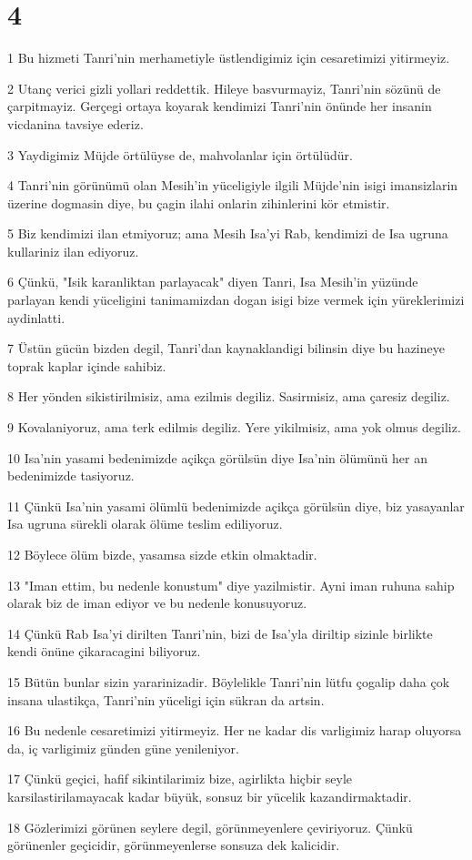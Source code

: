 \chapter{4}

\par 1 Bu hizmeti Tanri'nin merhametiyle üstlendigimiz için cesaretimizi yitirmeyiz.
\par 2 Utanç verici gizli yollari reddettik. Hileye basvurmayiz, Tanri'nin sözünü de çarpitmayiz. Gerçegi ortaya koyarak kendimizi Tanri'nin önünde her insanin vicdanina tavsiye ederiz.
\par 3 Yaydigimiz Müjde örtülüyse de, mahvolanlar için örtülüdür.
\par 4 Tanri'nin görünümü olan Mesih'in yüceligiyle ilgili Müjde'nin isigi imansizlarin üzerine dogmasin diye, bu çagin ilahi onlarin zihinlerini kör etmistir.
\par 5 Biz kendimizi ilan etmiyoruz; ama Mesih Isa'yi Rab, kendimizi de Isa ugruna kullariniz ilan ediyoruz.
\par 6 Çünkü, "Isik karanliktan parlayacak" diyen Tanri, Isa Mesih'in yüzünde parlayan kendi yüceligini tanimamizdan dogan isigi bize vermek için yüreklerimizi aydinlatti.
\par 7 Üstün gücün bizden degil, Tanri'dan kaynaklandigi bilinsin diye bu hazineye toprak kaplar içinde sahibiz.
\par 8 Her yönden sikistirilmisiz, ama ezilmis degiliz. Sasirmisiz, ama çaresiz degiliz.
\par 9 Kovalaniyoruz, ama terk edilmis degiliz. Yere yikilmisiz, ama yok olmus degiliz.
\par 10 Isa'nin yasami bedenimizde açikça görülsün diye Isa'nin ölümünü her an bedenimizde tasiyoruz.
\par 11 Çünkü Isa'nin yasami ölümlü bedenimizde açikça görülsün diye, biz yasayanlar Isa ugruna sürekli olarak ölüme teslim ediliyoruz.
\par 12 Böylece ölüm bizde, yasamsa sizde etkin olmaktadir.
\par 13 "Iman ettim, bu nedenle konustum" diye yazilmistir. Ayni iman ruhuna sahip olarak biz de iman ediyor ve bu nedenle konusuyoruz.
\par 14 Çünkü Rab Isa'yi dirilten Tanri'nin, bizi de Isa'yla diriltip sizinle birlikte kendi önüne çikaracagini biliyoruz.
\par 15 Bütün bunlar sizin yararinizadir. Böylelikle Tanri'nin lütfu çogalip daha çok insana ulastikça, Tanri'nin yüceligi için sükran da artsin.
\par 16 Bu nedenle cesaretimizi yitirmeyiz. Her ne kadar dis varligimiz harap oluyorsa da, iç varligimiz günden güne yenileniyor.
\par 17 Çünkü geçici, hafif sikintilarimiz bize, agirlikta hiçbir seyle karsilastirilamayacak kadar büyük, sonsuz bir yücelik kazandirmaktadir.
\par 18 Gözlerimizi görünen seylere degil, görünmeyenlere çeviriyoruz. Çünkü görünenler geçicidir, görünmeyenlerse sonsuza dek kalicidir.

